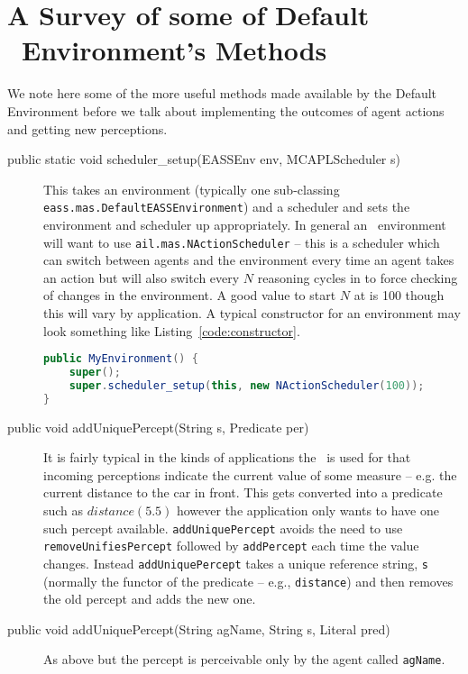 \documentclass[a4]{article}
\begin{document}
\section{A Survey of some of Default \eass\ Environment's Methods}
We note here some of the more useful methods made available by the Default Environment before we talk about implementing the outcomes of agent actions and getting new perceptions.

\begin{sloppypar}
\begin{description}
\item[public static void scheduler\_setup(EASSEnv env, MCAPLScheduler s)] This takes an environment (typically one sub-classing \texttt{eass.mas.DefaultEASSEnvironment}) and a scheduler and sets the environment and scheduler up appropriately.  In general an \eass\ environment will want to use \texttt{ail.mas.NActionScheduler} -- this is a scheduler which can switch between agents and the environment every time an agent takes an action but will also switch every $N$ reasoning cycles in to force checking of changes in the environment.  A good value to start $N$ at is 100 though this will vary by application.  A typical constructor for an environment may look something like Listing~\ref{code:constructor}.
\begin{lstlisting}[float,caption=Handling Numbers,basicstyle=\sffamily,language=Java,style=easslisting,label=code:constructor]
public MyEnvironment() {
	super();
	super.scheduler_setup(this, new NActionScheduler(100));
}
\end{lstlisting}
\item[public void addUniquePercept(String s, Predicate per)] It is fairly typical in the kinds of applications the \eass\ is used for that incoming perceptions indicate the current value of some measure -- e.g. the current distance to the car in front.  This gets converted into a predicate such as $distance(5.5)$ however the application only wants to have one such percept available.  \texttt{addUniquePercept} avoids the need to use \texttt{removeUnifiesPercept} followed by \texttt{addPercept} each time the value changes.  Instead \texttt{addUniquePercept} takes a unique reference string, \texttt{s} (normally the functor of the predicate -- e.g., \texttt{distance}) and then removes the old percept and adds the new one. 
\item[public void addUniquePercept(String agName, String s, Literal  pred)] As above but the percept is perceivable only by the agent called \texttt{agName}.
\end{description}
\end{sloppypar}
\end{document}
